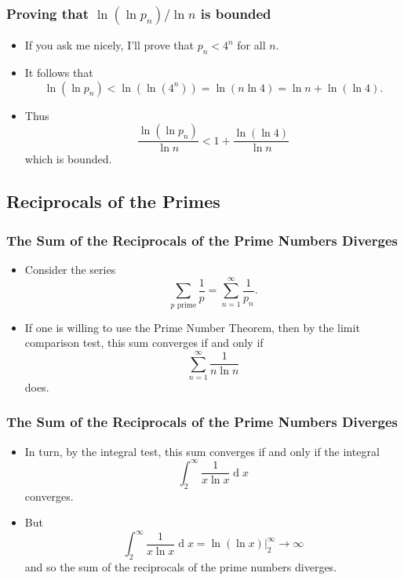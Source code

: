 \documentclass{beamer}
\newcommand{\dif}{\ensuremath{\operatorname{d}\!}}
\begin{document}
\begin{frame}
    \frametitle{Proving that $\ln(\ln p_n) \slash \ln n$ is bounded}

    \begin{itemize}
        \item If you ask me nicely, I'll prove that $p_n < 4^n$ for all $n$. \pause
        \item It follows that
        \[
            \ln(\ln p_n) < \ln\left(\ln\left( 4^n \right)\right) = \ln\left( n \ln 4 \right) = \ln n + \ln(\ln 4).
        \]
        \pause
        \item Thus
        \[
            \frac{\ln(\ln p_n)}{\ln n} < 1 + \frac{\ln(\ln 4)}{\ln n}
        \]
        which is bounded.
    \end{itemize}

\end{frame}

\subsection{Reciprocals of the Primes}

\begin{frame}
    \frametitle{The Sum of the Reciprocals of the Prime Numbers Diverges}

    \begin{itemize}
        \item Consider the series
        \[
            \sum_{p \text{ prime}} \frac{1}{p} = \sum_{n = 1}^{\infty} \frac{1}{p_n}.
        \] \pause
        \item If one is willing to use the Prime Number Theorem, then by the limit comparison test, this sum converges if and only if
        \[
            \sum_{n = 1}^{\infty} \frac{1}{n \ln n}
        \]
        does.
    \end{itemize}

\end{frame}

\begin{frame}
    \frametitle{The Sum of the Reciprocals of the Prime Numbers Diverges}

    \begin{itemize}
        \item In turn, by the integral test, this sum converges if and only if the integral
        \[
            \int_2^\infty \frac{1}{x \ln x} \dif x
        \]
        converges. \pause
        \item But
        \[
            \int_2^\infty \frac{1}{x \ln x} \dif x = \ln(\ln x) \Big|_{2}^{\infty} \to \infty
        \]
        and so the sum of the reciprocals of the prime numbers diverges.

    \end{itemize}

\end{frame}
\end{document}
